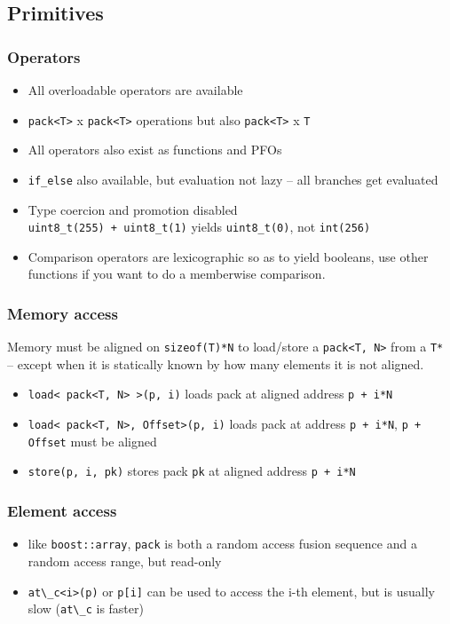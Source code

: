 \documentclass{beamer}
\begin{document}
\subsection{Primitives}

\begin{frame}
	\frametitle{Operators}
	
	\begin{itemize}
		\item All overloadable operators are available
		\item \lstinline{pack<T>} x \lstinline{pack<T>} operations but also \lstinline{pack<T>} x \lstinline{T}
		\item All operators also exist as functions and PFOs
		\item \lstinline{if_else} also available, but evaluation not lazy -- all branches get evaluated
		\item Type coercion and promotion disabled\\
		      \lstinline{uint8_t(255) + uint8_t(1)} yields \lstinline{uint8_t(0)}, not \lstinline{int(256)}
		\item Comparison operators are lexicographic so as to yield booleans,
		      use other functions if you want to do a memberwise comparison.
	\end{itemize}	
	
\end{frame}

\begin{frame}
	\frametitle{Memory access}
	
	Memory must be aligned on \lstinline{sizeof(T)*N} to load/store a \lstinline{pack<T, N>}
	from a \lstinline{T*}\\
	-- except when it is statically known by how many elements it is not aligned.
	
	\begin{itemize}
		\item \lstinline{load< pack<T, N> >(p, i)} loads pack at aligned address \lstinline{p + i*N}
		\item \lstinline{load< pack<T, N>, Offset>(p, i)} loads pack at address \lstinline{p + i*N}, \lstinline{p + Offset} must be aligned
		\item \lstinline{store(p, i, pk)} stores pack \lstinline{pk} at aligned address \lstinline{p + i*N}
	\end{itemize}
\end{frame}

\begin{frame}
	\frametitle{Element access}
	
	\begin{itemize}
		\item like \lstinline{boost::array}, \lstinline{pack} is both a random access fusion sequence and a random access range, but read-only
		\item \lstinline{at\_c<i>(p)} or \lstinline{p[i]} can be used to access the i-th element, but is usually slow (\lstinline{at\_c} is faster)
	\end{itemize}
	
\end{frame}
\end{document}
